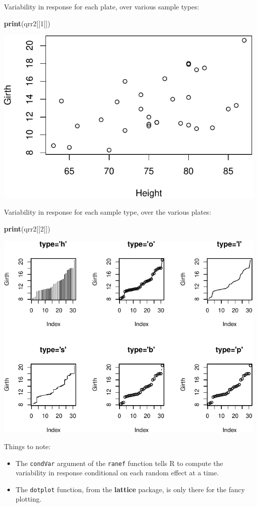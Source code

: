 \documentclass[]{book}
\newenvironment{Shaded}{\begin{snugshade}}{\end{snugshade}}
\newcommand{\KeywordTok}[1]{\textcolor[rgb]{0.13,0.29,0.53}{\textbf{#1}}}
\newcommand{\DecValTok}[1]{\textcolor[rgb]{0.00,0.00,0.81}{#1}}
\newcommand{\NormalTok}[1]{#1}
\providecommand{\tightlist}{%
  \setlength{\itemsep}{0pt}\setlength{\parskip}{0pt}}
\theoremstyle{definition}
\theoremstyle{definition}
\theoremstyle{definition}
\theoremstyle{remark}
\begin{document}
Variability in response for each plate, over various sample types:

\begin{Shaded}
\begin{Highlighting}[]
\KeywordTok{print}\NormalTok{(qrr2[[}\DecValTok{1}\NormalTok{]]) }
\end{Highlighting}
\end{Shaded}

\includegraphics[width=0.5\linewidth]{Rcourse_files/figure-latex/unnamed-chunk-206-1}

Variability in response for each sample type, over the various plates:

\begin{Shaded}
\begin{Highlighting}[]
\KeywordTok{print}\NormalTok{(qrr2[[}\DecValTok{2}\NormalTok{]])  }
\end{Highlighting}
\end{Shaded}

\includegraphics[width=0.5\linewidth]{Rcourse_files/figure-latex/unnamed-chunk-207-1}

Things to note:

\begin{itemize}
\tightlist
\item
  The \texttt{condVar} argument of the \texttt{ranef} function tells R
  to compute the variability in response conditional on each random
  effect at a time.
\item
  The \texttt{dotplot} function, from the \textbf{lattice} package, is
  only there for the fancy plotting.
\end{itemize}
\end{document}
